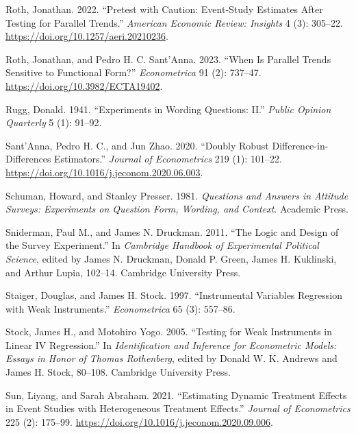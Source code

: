 \documentclass[
]{article}
\newlength{\cslhangindent}
\newenvironment{CSLReferences}[2] %
 {\begin{list}{}{%
  \setlength{\itemindent}{0pt}
  \setlength{\leftmargin}{0pt}
  \setlength{\parsep}{0pt}
  \ifodd #1
   \setlength{\leftmargin}{\cslhangindent}
   \setlength{\itemindent}{-1\cslhangindent}
  \fi
  \setlength{\itemsep}{#2\baselineskip}}}
 {\end{list}}
\begin{document}
\begin{CSLReferences}{1}{0}
Roth, Jonathan. 2022. {``Pretest with Caution: Event-Study Estimates After Testing for Parallel Trends.''} \emph{American Economic Review: Insights} 4 (3): 305--22. \url{https://doi.org/10.1257/aeri.20210236}.

Roth, Jonathan, and Pedro H. C. Sant'Anna. 2023. {``When Is Parallel Trends Sensitive to Functional Form?''} \emph{Econometrica} 91 (2): 737--47. \url{https://doi.org/10.3982/ECTA19402}.

Rugg, Donald. 1941. {``Experiments in Wording Questions: {II}.''} \emph{Public Opinion Quarterly} 5 (1): 91--92.

Sant'Anna, Pedro H. C., and Jun Zhao. 2020. {``Doubly Robust Difference-in-Differences Estimators.''} \emph{Journal of Econometrics} 219 (1): 101--22. \url{https://doi.org/10.1016/j.jeconom.2020.06.003}.

Schuman, Howard, and Stanley Presser. 1981. \emph{Questions and Answers in Attitude Surveys: Experiments on Question Form, Wording, and Context}. Academic Press.

Sniderman, Paul M., and James N. Druckman. 2011. {``The Logic and Design of the Survey Experiment.''} In \emph{Cambridge Handbook of Experimental Political Science}, edited by James N. Druckman, Donald P. Green, James H. Kuklinski, and Arthur Lupia, 102--14. Cambridge University Press.

Staiger, Douglas, and James H. Stock. 1997. {``Instrumental Variables Regression with Weak Instruments.''} \emph{Econometrica} 65 (3): 557--86.

Stock, James H., and Motohiro Yogo. 2005. {``Testing for Weak Instruments in Linear {IV} Regression.''} In \emph{Identification and Inference for Econometric Models: Essays in Honor of {Thomas Rothenberg}}, edited by Donald W. K. Andrews and James H. Stock, 80--108. Cambridge University Press.

Sun, Liyang, and Sarah Abraham. 2021. {``Estimating Dynamic Treatment Effects in Event Studies with Heterogeneous Treatment Effects.''} \emph{Journal of Econometrics} 225 (2): 175--99. \url{https://doi.org/10.1016/j.jeconom.2020.09.006}.


\end{CSLReferences}
\end{document}
